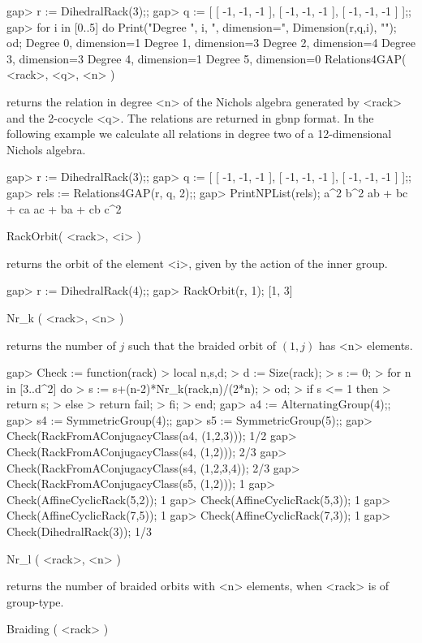 \beginexample
gap> r := DihedralRack(3);;
gap> q := [ [ -1, -1, -1 ], [ -1, -1, -1 ], [ -1, -1, -1 ] ];;
gap> for i in [0..5] do
Print("Degree ", i, ", dimension=", Dimension(r,q,i), "\n");
od;
Degree 0, dimension=1
Degree 1, dimension=3
Degree 2, dimension=4
Degree 3, dimension=3
Degree 4, dimension=1
Degree 5, dimension=0
\endexample
\> Relations4GAP( <rack>, <q>, <n> )

returns the relation in degree <n> of the Nichols algebra generated by
<rack> and the 2-cocycle <q>. The relations are returned in gbnp format. 
In the following example we calculate all relations in degree two of a 
12-dimensional Nichols algebra.

\beginexample
gap> r := DihedralRack(3);;
gap> q := [ [ -1, -1, -1 ], [ -1, -1, -1 ], [ -1, -1, -1 ] ];;
gap> rels := Relations4GAP(r, q, 2);;
gap> PrintNPList(rels);
 a^2 
 b^2 
 ab + bc + ca 
 ac + ba + cb 
 c^2 
\endexample

\> RackOrbit( <rack>, <i> )

returns the orbit of the element <i>, given by the action of 
the inner group.

\beginexample
gap> r := DihedralRack(4);;
gap> RackOrbit(r, 1);
[1, 3]
\endexample

\>Nr_k ( <rack>, <n> )

returns the number of $j$ such that the braided orbit of $(1,j)$ 
has <n> elements.

\beginexample
gap> Check := function(rack)
> local n,s,d;
> d := Size(rack);
> s := 0;
> for n in [3..d^2] do
>   s := s+(n-2)*Nr_k(rack,n)/(2*n);
> od;
> if s <= 1 then
>   return s;
> else
>   return fail;
> fi;
> end;
gap> a4 := AlternatingGroup(4);;
gap> s4 := SymmetricGroup(4);;
gap> s5 := SymmetricGroup(5);;
gap> Check(RackFromAConjugacyClass(a4, (1,2,3)));
1/2
gap> Check(RackFromAConjugacyClass(s4, (1,2)));    
2/3
gap> Check(RackFromAConjugacyClass(s4, (1,2,3,4));
2/3
gap> Check(RackFromAConjugacyClass(s5, (1,2)));    
1
gap> Check(AffineCyclicRack(5,2));                            
1
gap> Check(AffineCyclicRack(5,3));
1
gap> Check(AffineCyclicRack(7,5));  
1
gap> Check(AffineCyclicRack(7,3));
1
gap> Check(DihedralRack(3));      
1/3
\endexample

\>Nr_l ( <rack>, <n> )

returns the number of braided orbits with <n> elements, when
<rack> is of group-type.

\>Braiding ( <rack> )

